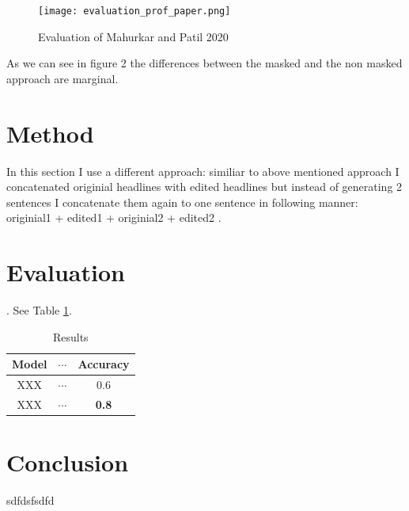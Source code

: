 \documentclass[11pt,a4paper,onecolumn,oneside,notitlepage]{article}
\begin{document}
			\begin{figure}
		\begin{center}
			\texttt{[image: evaluation\_prof\_paper.png]}
		\end{center}
		
		\caption{Evaluation of Mahurkar and Patil 2020}\label{fig2}
	\end{figure}	
    As we can see in figure 2  the differences between the masked and the non masked approach are marginal.
	\section{Method}
	In this section I use a different approach: similiar to above mentioned approach I concatenated originial headlines with edited headlines but instead of generating 2 sentences I concatenate them again to one sentence in following manner: originial1 + edited1 + originial2 + edited2 .
	
		
	\section{Evaluation}
     . See Table \ref{tab1}.
		
		\begin{table}
			\begin{center}
				\begin{tabular}{|c|c|c|}
					\hline
					\textbf{Model} & $\cdots$ & \textbf{Accuracy}\\
					\hline
					\hline
					XXX & $\cdots$ & 0.6\\
					\hline
					XXX & $\cdots$ & \textbf{0.8}\\
					\hline
				\end{tabular}
			\end{center}
			
			\caption{Results}\label{tab1}
		\end{table}				
		

	\section{Conclusion}

	sdfdsfsdfd
	\printbibliography
\end{document}
